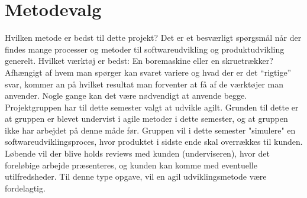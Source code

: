 \section{Metodevalg}\label{sec:valgafprocesmodel}
Hvilken metode er bedst til dette projekt? Det er et besværligt spørgsmål når der findes mange processer 
og metoder til softwareudvikling og produktudvikling generelt. Hvilket værktøj er bedst: En boremaskine 
eller en skruetrækker? Afhængigt af hvem man spørger kan svaret variere og hvad der er det “rigtige” svar, 
kommer an på hvilket resultat man forventer at få af de værktøjer man anvender. Nogle gange kan det være nødvendigt at anvende begge. \\

Projektgruppen har til dette semester valgt at udvikle agilt. Grunden til dette er at gruppen er blevet undervist i agile metoder i dette
semester, og at gruppen ikke har arbejdet på denne måde før. Gruppen vil i dette semester "simulere" en softwareudviklingsproces, hvor produktet
i sidste ende skal overrækkes til kunden. Løbende vil der blive holds reviews med kunden (underviseren), hvor det foreløbige arbejde præsenteres,
og kunden kan komme med eventuelle utilfredsheder. Til denne type opgave, vil en agil udviklingsmetode være fordelagtig.    